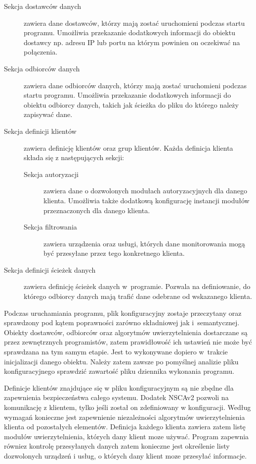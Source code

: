 \begin{description}
\item[Sekcja dostawców danych] zawiera dane dostawców, którzy mają
  zostać uruchomieni podczas startu programu. Umożliwia przekazanie
  dodatkowych informacji do obiektu dostawcy np. adresu IP lub portu
  na którym powinien on oczekiwać na połączenia. 
\item[Sekcja odbiorców danych] zawiera dane odbiorców danych, którzy
  mają zostać uruchomieni podczas startu programu. Umożliwia
  przekazanie dodatkowych informacji do obiektu odbiorcy danych,
  takich jak ścieżka do pliku do którego należy zapisywać dane. 
\item[Sekcja definicji klientów] zawiera definicję klientów oraz grup
  klientów. Każda definicja klienta składa się z następujących sekcji:
  \begin{description}
  \item[Sekcja autoryzacji] zawiera dane o dozwolonych modułach
    autoryzacyjnych dla danego klienta. Umożliwia także dodatkową
    konfigurację instancji modułów przeznaczonych dla danego klienta.
  \item[Sekcja filtrowania] zawiera urządzenia oraz usługi, których
    dane monitorowania mogą być przesyłane przez tego konkretnego
    klienta.
  \end{description}
\item[Sekcja definicji ścieżek danych] zawiera definicję ścieżek
  danych w~programie. Pozwala na definiowanie, do którego odbiorcy
  danych mają trafić dane odebrane od wskazanego klienta.
\end{description}

Podczas uruchamiania programu, plik konfiguracyjny zostaje przeczytany
oraz sprawdzony pod kątem poprawności zarówno składniowej jak
i~semantycznej. Obiekty dostawców, odbiorców oraz algorytmów
uwierzytelnienia dostarczane są przez zewnętrznych programistów, zatem
prawidłowość ich ustawień nie może być sprawdzana na tym samym
etapie. Jest to wykonywane dopiero w~trakcie inicjalizacji danego
obiektu. Należy zatem zawsze po pomyślnej analizie pliku
konfiguracyjnego sprawdzić zawartość pliku dziennika wykonania
programu. 

Definicje klientów znajdujące się w pliku konfiguracyjnym są nie
zbędne dla zapewnienia bezpieczeństwa całego systemu. Dodatek NSCAv2
pozwoli na komunikację z klientem, tylko jeśli został on zdefiniowany
w konfiguracji. Według wymagań konieczne jest zapewnienie
niezależności algorytmów uwierzytelnienia klienta od pozostałych
elementów. Definicja każdego klienta zawiera zatem listę modułów
uwierzytelnienia, których dany klient moze używać. Program zapewnia
równiez kontrolę przesyłanych danych zatem konieczne jest określenie
listy dozwolonych urządzeń i usług, o których dany klient moze
przesyłać informacje.

